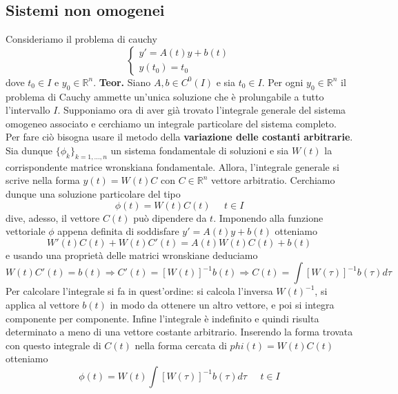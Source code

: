 \subsection{Sistemi non omogenei}
Consideriamo il problema di cauchy
\[
    \begin{cases}
        y' = A(t) y + b(t)\\
        y(t_0) = t_0
    \end{cases}
\]
dove $t_0 \in I$ e $y_0 \in \mathbb{R}^n$.\newline
\newline
\textbf{Teor.} Siano $A,b \in C^0 (I)$ e sia $t_0 \in I$. Per ogni $y_0 \in \mathbb{R}^n$ il problema di Cauchy ammette un'unica soluzione che è prolungabile a tutto l'intervallo $I$.\newline
\newline
Supponiamo ora di aver già trovato l'integrale generale del sistema omogeneo associato e cerchiamo un integrale particolare del sistema completo. Per fare ciò bisogna usare il metodo della \textbf{variazione delle costanti arbitrarie}. Sia dunque $\{ \phi_k\}_{k = 1, \dots, n}$ un sistema fondamentale di soluzioni e sia $W(t)$ la corrispondente matrice wronskiana fondamentale. Allora, l'integrale generale si scrive nella forma $y(t) = W(t) C$ con $C \in \mathbb{R}^n$ vettore arbitratio. Cerchiamo dunque una soluzione particolare del tipo
\[
    \phi(t) = W(t) C(t) \;\;\;\;\;t \in I
\]
dive, adesso, il vettore $C(t)$ può dipendere da $t$. Imponendo alla funzione vettoriale $\phi$ appena definita di soddisfare $y' = A(t) y + b(t)$ otteniamo 
\[
    W'(t) C(t) + W(t) C'(t) = A(t) W(t)C(t) + b(t)
\]
e usando una proprietà delle matrici wronskiane deduciamo
\[
    W(t) C'(t) = b(t) \Longrightarrow C'(t) = [W(t)]^{-1} b(t) \Longrightarrow C(t) = \int [W(\tau)]^{-1} b(\tau) d \tau
\]
Per calcolare l'integrale si fa in quest'ordine: si calcola l'inversa $W(t)^{-1}$, si applica al vettore $b(t)$ in modo da ottenere un altro vettore, e poi si integra componente per componente. Infine l'integrale è indefinito e quindi risulta determinato a meno di una vettore costante arbitrario.\newline
Inserendo la forma trovata con questo integrale di $C(t)$ nella forma cercata di $phi(t)= W(t) C(t)$ otteniamo
\[
    \phi(t) = W(t) \int[W(\tau)]^{-1} b (\tau) d \tau \;\;\;\;\; t \in I
\]
